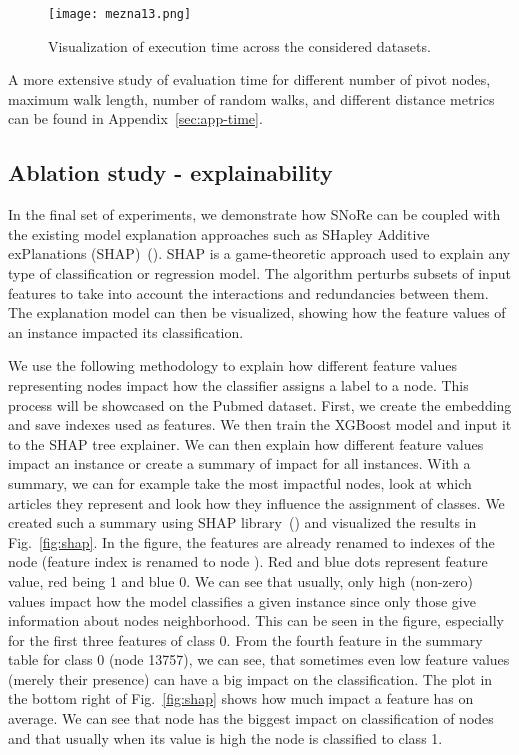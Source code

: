 \documentclass[twoside,11pt]{article}
\begin{document}
\begin{figure}[t!]
  \centering
  \texttt{[image: mezna13.png]}
  \caption{Visualization of execution time across the considered datasets.}
  \label{fig:time}
\end{figure}

A more extensive study of evaluation time for different number of pivot nodes, maximum walk length, number of random walks, and different distance metrics can be found in Appendix~\ref{sec:app-time}.

\subsection{Ablation study - explainability}
\label{sec:ablation-explainability}
In the final set of experiments, we demonstrate how SNoRe can be coupled with the existing model explanation approaches such as SHapley Additive exPlanations (SHAP)~(\cite{lundberg2017shap,vstrumbelj2014explaining}). SHAP is a game-theoretic approach used to explain any type of classification or regression model. The algorithm perturbs subsets of input features to take into account the interactions and redundancies between them. The explanation model can then be visualized, showing how the feature values of an instance impacted its classification.

We use the following methodology to explain how different feature values representing nodes impact how the classifier assigns a label to a node. This process will be showcased on the Pubmed dataset. First, we create the embedding and save indexes used as features. We then train the XGBoost model and input it to the SHAP tree explainer. We can then explain how different feature values impact an instance or create a summary of impact for all instances. With a summary, we can for example take the most impactful nodes, look at which articles they represent and look how they influence the assignment of classes. We created such a summary using SHAP library~(\cite{lundberg2020local2global}) and visualized the results in Fig.~\ref{fig:shap}. In the figure, the features are already renamed to indexes of the node (feature index  is renamed to node ). Red and blue dots represent feature value, red being 1 and blue 0. We can see that usually, only high (non-zero) values impact how the model classifies a given instance since only those give information about nodes neighborhood. This can be seen in the figure, especially for the first three features of class 0. From the fourth feature in the summary table for class 0 (node 13757), we can see, that sometimes even low feature values (merely their presence) can have a big impact on the classification. The plot in the bottom right of Fig.~\ref{fig:shap} shows how much impact a feature has on average. We can see that node  has the biggest impact on classification of nodes and that usually when its value is high the node is classified to class 1.
\end{document}
